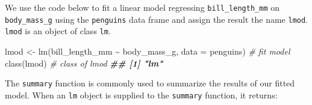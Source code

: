 \documentclass[
]{book}
\newenvironment{Shaded}{\begin{snugshade}}{\end{snugshade}}
\newcommand{\AttributeTok}[1]{\textcolor[rgb]{0.77,0.63,0.00}{#1}}
\newcommand{\CommentTok}[1]{\textcolor[rgb]{0.56,0.35,0.01}{\textit{#1}}}
\newcommand{\DocumentationTok}[1]{\textcolor[rgb]{0.56,0.35,0.01}{\textbf{\textit{#1}}}}
\newcommand{\FunctionTok}[1]{\textcolor[rgb]{0.00,0.00,0.00}{#1}}
\newcommand{\NormalTok}[1]{#1}
\newcommand{\OtherTok}[1]{\textcolor[rgb]{0.56,0.35,0.01}{#1}}
\newcommand{\SpecialCharTok}[1]{\textcolor[rgb]{0.00,0.00,0.00}{#1}}
\theoremstyle{definition}
\theoremstyle{definition}
\theoremstyle{definition}
\theoremstyle{definition}
\theoremstyle{remark}
\begin{document}
We use the code below to fit a linear model regressing \texttt{bill\_length\_mm} on \texttt{body\_mass\_g} using the \texttt{penguins} data frame and assign the result the name \texttt{lmod}. \texttt{lmod} is an object of class \texttt{lm}.

\begin{Shaded}
\begin{Highlighting}[]
\NormalTok{lmod }\OtherTok{\textless{}{-}} \FunctionTok{lm}\NormalTok{(bill\_length\_mm }\SpecialCharTok{\textasciitilde{}}\NormalTok{ body\_mass\_g, }\AttributeTok{data =}\NormalTok{ penguins) }\CommentTok{\# fit model}
\FunctionTok{class}\NormalTok{(lmod) }\CommentTok{\# class of lmod}
\DocumentationTok{\#\# [1] "lm"}
\end{Highlighting}
\end{Shaded}

The \texttt{summary} function is commonly used to summarize the results of our fitted model. When an \texttt{lm} object is supplied to the \texttt{summary} function, it returns:
\end{document}
